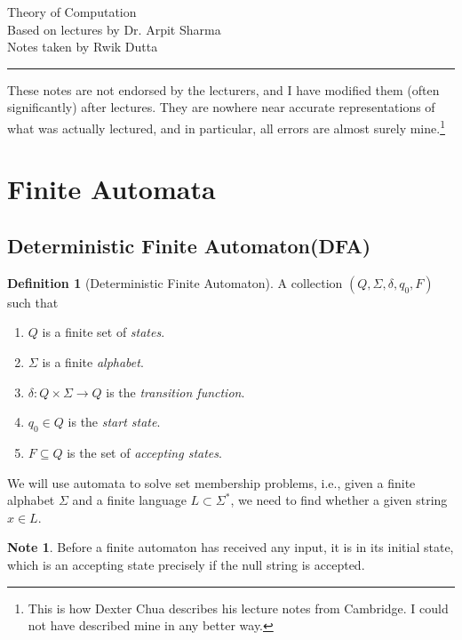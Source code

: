 \documentclass[10pt, a4paper]{extarticle}
\theoremstyle{definition}
\newtheorem{defn}{Definition}
\newtheorem*{note*}{Note}
\begin{document}
\begin{center}
	\fontsize{25}{60}\selectfont Theory of Computation \\
	\large Based on lectures by Dr. Arpit Sharma\\
	Notes taken by Rwik Dutta
\end{center}
\hrule
\begin{center}
	These notes are not endorsed by the lecturers, and I have modified them (often
	significantly) after lectures. They are nowhere near accurate representations of what
	was actually lectured, and in particular, all errors are almost surely mine.\footnote[1]{This is how Dexter Chua describes his lecture notes from Cambridge. I could not have described mine in any better way.}
\end{center}
\tableofcontents

\newpage

\section{Finite Automata}
\subsection{Deterministic Finite Automaton(DFA)}
\begin{defn}[Deterministic Finite Automaton]
	A collection $(Q,\Sigma,\delta,q_0,F)$ such that
	\begin{enumerate}
		\item $Q$ is a finite set of \emph{states}.
		\item $\Sigma$ is a finite \emph{alphabet}.
		\item $\delta:Q\times\Sigma\to Q$ is the \emph{transition function}.
		\item $q_0\in Q$ is the \emph{start state}.
		\item $F\subseteq Q$ is the set of \emph{accepting states}.
	\end{enumerate}
\end{defn}
We will use automata to solve set membership problems, i.e., given a finite alphabet $\Sigma$ and a finite language $L\subset \Sigma^*$, we need to find whether a given string $x\in L$.

\begin{note*}
	Before a finite automaton has received any input, it is in its initial state, which is an accepting state precisely if the null string is accepted.
\end{note*}
\end{document}
